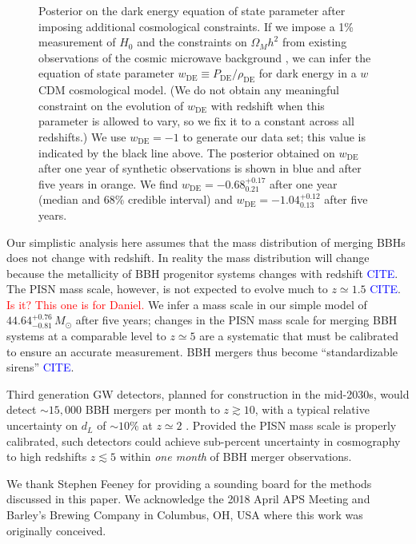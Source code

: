 \documentclass[modern]{aastex62}
\newcommand{\citationhere}{\textcolor{blue}{CITE}}
\newcommand{\fixme}[1]{\textcolor{red}{#1}}
\newcommand{\wDE}{w_\mathrm{DE}}
\newcommand{\MScaleFiveYear}{44.64^{+0.76}_{-0.81} \, \MSun{}}
\newcommand{\wDEOneYear}{-0.68^{+0.17}_{0.21}}
\newcommand{\wDEFiveYear}{-1.04^{+0.12}_{0.13}}
\newcommand{\MSun}{M_\odot}
\begin{document}
\begin{figure}
%
  \caption{\label{fig:wDE} Posterior on the dark energy equation of state
  parameter after imposing additional cosmological constraints.  If we impose a
  1\% measurement of $H_0$ \citep{Chen2017,Mortlock2018} and the constraints on
  $\Omega_M h^2$ from existing observations of the cosmic microwave background
  \citep{Planck2016}, we can infer the equation of state parameter $\wDE{}
  \equiv P_\mathrm{DE} / \rho_\mathrm{DE}$ for dark energy in a $w$CDM
  cosmological model.  (We do not obtain any meaningful constraint on the
  evolution of $\wDE{}$ with redshift when this parameter is allowed to vary, so
  we fix it to a constant across all redshifts.)  We use $\wDE{} = -1$ to
  generate our data set; this value is indicated by the black line above.  The
  posterior obtained on $\wDE{}$ after one year of synthetic observations is
  shown in blue and after five years in orange.  We find $\wDE{} =
  \wDEOneYear{}$ after one year (median and 68\% credible interval) and $\wDE{}
  = \wDEFiveYear{}$ after five years.}
%
\end{figure}

Our simplistic analysis here assumes that the mass distribution of merging
\acp{BBH} does not change with redshift.  In reality the mass distribution will
change because the metallicity of \ac{BBH} progenitor systems changes with
redshift \citationhere{}.  The \ac{PISN} mass scale, however, is not expected to
evolve much to $z \simeq 1.5$ \citationhere{}.  \fixme{Is it?  This one is for
Daniel.}  We infer a mass scale in our simple model of $\MScaleFiveYear{}$ after
five years; changes in the \ac{PISN} mass scale for merging \ac{BBH} systems at
a comparable level to $z \simeq 5$ are a systematic that must be calibrated to
ensure an accurate measurement.  \ac{BBH} mergers thus become ``standardizable
sirens'' \citationhere{}.

Third generation \ac{GW} detectors, planned for construction in the mid-2030s,
would detect $\sim 15,000$ \ac{BBH} mergers per month to $z \gtrsim 10$, with a
typical relative uncertainty on $d_L$ of $\sim 10 \%$ at $z \simeq 2$
\citep{Vitale2018}.  Provided the \ac{PISN} mass scale is properly calibrated,
such detectors could achieve sub-percent uncertainty in cosmography to high
redshifts $z \lesssim 5$ within \emph{one month} of \ac{BBH} merger
observations.

\acknowledgments

We thank Stephen Feeney for providing a sounding board for the methods discussed
in this paper.  We acknowledge the 2018 April APS Meeting and Barley's Brewing
Company in Columbus, OH, USA where this work was originally conceived.
\end{document}
